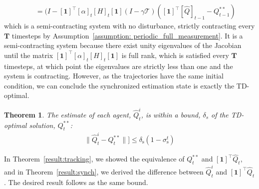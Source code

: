 \documentclass[journal]{IEEEtran}
\newtheorem{theorem}{Theorem}
\begin{document}
\begin{IEEEproof}
\begin{align*}
        & \ \ \ \ = (I - [\boldsymbol{1}]^\intercal [\alpha]_t [H]_t [\boldsymbol{1}]( I - \gamma \mathcal{T}) ([\boldsymbol{1}]^\intercal [\hat{Q}]_{t-1} - Q^{**}_{t-1}) 
    \end{align*}
    which is a semi-contracting system with no disturbance, strictly contracting every $\boldsymbol{T}$ timesteps by Assumption~\ref{assumption: periodic_full_measurement}. It is a semi-contracting system because there exist unity eigenvalues of the Jacobian until the matrix $[\boldsymbol{1}]^\intercal [\alpha]_t [H]_t [\boldsymbol{1}]$ is full rank, which is satisfied every $\boldsymbol{T}$ timesteps, at which point the eigenvalues are strictly less than one and the system is contracting. However, as the trajectories have the same initial condition, we can conclude the synchronized estimation state is exactly the TD-optimal. 
\end{IEEEproof}

\begin{theorem}
    \label{result:t+s}
    The estimate of each agent, $\hat{Q}_t^i$, is within a bound, $\delta_s$ of the TD-optimal solution, $Q_t^{**}$:
    \begin{align*}
        \| \hat{Q}_t^i - Q_t^{**}\| ] \leq \delta_\mathrm{s} ( 1 - \sigma_\mathrm{s}^t)
    \end{align*}
\end{theorem}
\begin{IEEEproof}
In Theorem~\ref{result:tracking}, we showed the equivalence of $Q_t^{**}$ and $[\boldsymbol{1}]^\intercal \hat{Q}_t$, and in Theorem~\ref{result:synch}, we derived the difference between $\hat{Q}^i_t$ and $[\boldsymbol{1}]^\intercal \hat{Q}_t$. The desired result follows as the same bound. 
\end{IEEEproof}
\end{document}
